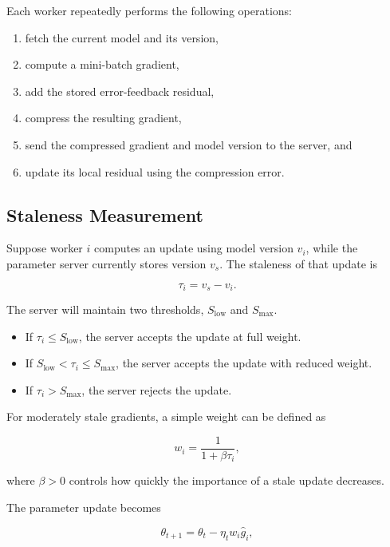 \documentclass[conference]{IEEEtran}
\begin{document}
Each worker repeatedly performs the following operations:
\begin{enumerate}
    \item fetch the current model and its version,
    \item compute a mini-batch gradient,
    \item add the stored error-feedback residual,
    \item compress the resulting gradient,
    \item send the compressed gradient and model version to the server, and
    \item update its local residual using the compression error.
\end{enumerate}

\subsection{Staleness Measurement}

Suppose worker $i$ computes an update using model version $v_i$, while the parameter server currently stores version $v_s$. The staleness of that update is

\begin{equation}
\tau_i = v_s - v_i.
\end{equation}

The server will maintain two thresholds, $S_{\text{low}}$ and $S_{\text{max}}$.

\begin{itemize}
    \item If $\tau_i \leq S_{\text{low}}$, the server accepts the update at full weight.
    \item If $S_{\text{low}} < \tau_i \leq S_{\text{max}}$, the server accepts the update with reduced weight.
    \item If $\tau_i > S_{\text{max}}$, the server rejects the update.
\end{itemize}

For moderately stale gradients, a simple weight can be defined as

\begin{equation}
w_i = \frac{1}{1 + \beta \tau_i},
\end{equation}

where $\beta > 0$ controls how quickly the importance of a stale update decreases.

The parameter update becomes

\begin{equation}
\theta_{t+1} = \theta_t - \eta_t w_i \hat{g}_i,
\end{equation}
\end{document}
